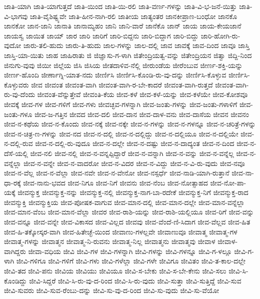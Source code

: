 ಜಾತಿ-ಯಾಗಿ
ಜಾತಿ-ಯಾಗುತ್ತದೆ
ಜಾತಿ-ಯಿಂದ
ಜಾತಿ-ಯಿ-ರಲಿ
ಜಾತಿ-ವರ್ಣ-ಗಳನ್ನು
ಜಾತಿ-ವಿ-ಭ-ಜನೆ-ಯಿತ್ತು
ಜಾತಿ-ವಿ-ಭಾಗವು
ಜಾತಿ-ವೈಶಿಷ್ಟ್ಯವೇ
ಜಾತಿ-ಹೀನ-ನಾಗಿ-ರಲಿ
ಜಾತೀಯ
ಜಾತ್ಯಂತರ
ಜಾನಕೀಪ್ರಾಣ-ಬಂಧೋ
ಜಾನಕೊ
ಜಾನಕೋ
ಜಾನ-ಜಾನಿ
ಜಾನಾತಿ
ಜಾನಾಮ್ಯಹಂ
ಜಾನಿ
ಜಾನಿ-ವಾರೆ
ಜಾನೆಕೊ
ಜಾನ್
ಜಾಯ
ಜಾಯ-ಕೇಯಜಾನೆ
ಜಾಯಸ್ವ
ಜಾಯಿತ
ಜಾಯ್
ಜಾರ
ಜಾರಿ
ಜಾರಿಗೆ
ಜಾರಿ-ಬಿದ್ದನು
ಜಾರಿ-ಬಿದ್ದಾಗ
ಜಾರಿ-ಬಿದ್ದು
ಜಾರಿ-ಹೋಗಿ-ರು-ವುದೋ
ಜಾರು-ತಲಿ-ಹುದು
ಜಾರು-ತಿ-ಹುದು
ಜಾಲ-ಗಳನ್ನು
ಜಾಲ-ದಲ್ಲಿ
ಜಾವ
ಜಾವಕ್ಕೆ
ಜಾವ-ದಿಂದ
ಜಾವೂ
ಜಾಸ್ತಿ
ಜಾಸ್ತಿ-ಯಾ-ಯಿತು
ಜಾಹ
ಜಾಹಿರಾತು
ಜಿ
ಜಿಜ್ಞಾಸು-ಗ-ಳಾಗಿ
ಜಿತೇಂದ್ರಿಯತ್ವ-ವನ್ನು
ಜಿತೇಂದ್ರಿಯನ
ಜಿತ್ವಾ
ಜಿದ್ದಿ-ನಿಂದ
ಜಿನುಗು-ವುವು
ಜಿಯೀ
ಜಿಲ್ಲೆಯ
ಜಿಸಿ
ಜಿಸಿಯ
ಜೀತದಾಳಿವ-ನೆಲ್ಲಿ
ಜೀರುಂಡೆಯ
ಜೀರೆಂಬುವ
ಜೀರ್ಣ-ಶಕ್ತಿ-ಯನ್ನು
ಜೀರ್ಣ-ಹೊಂದಿ
ಜೀರ್ಣಾಗ್ನಿ-ಯಾತ-ನದು
ಜೀರ್ಣಿಸಿ
ಜೀರ್ಣಿಸಿ-ಕೊಂಡಿ-ರು-ವು-ದನ್ನು
ಜೀರ್ಣಿಸಿ-ಕೊಳ್ಳುವ
ಜೀರ್ಣಿಸಿ-ಕೊಳ್ಳುವರು
ಜೀವ
ಜೀವಂತ
ಜೀವಂತ-ವಾಗಿ
ಜೀವಂತ-ವಾಗಿ-ರ-ಬೇ-ಕಾದರೆ
ಜೀವಂತ-ವಾಗಿ-ರುತ್ತದೆ
ಜೀವಂತ-ವಾಗಿ-ರು-ವು-ದೆಂದು
ಜೀವಂತ-ವೆನ್ನುತ್ತೇವೆ
ಜೀವಂತಿ-ಕೆಯ
ಜೀವ-ಕಳೆ
ಜೀವ-ಕಳೆ-ಯನ್ನು
ಜೀವ-ಕಳೆಯೇ
ಜೀವ-ಕೋಶವೂ
ಜೀವಕ್ಕೆ
ಜೀವ-ಗಳ
ಜೀವ-ಗಳಿಗೆ
ಜೀವ-ಗಳು
ಜೀವಚ್ಛವ-ಗಳನ್ನಾಗಿ
ಜೀವ-ಜಂತು-ಗಳನ್ನು
ಜೀವ-ಜಂತು-ಗಳಾಳಿಗೆ
ಜೀವ-ಜಂತು-ಗಳೂ
ಜೀವ-ಜ-ಗತ್ತಿನ
ಜೀವದ
ಜೀವ-ದಲಿ
ಜೀವ-ದಾನ
ಜೀವ-ದಾಳ-ವನು
ಜೀವ-ದಾಸೆಯ
ಜೀವನ
ಜೀವನಂ
ಜೀವ-ನ-ಕಥೆಯ
ಜೀವ-ನ-ಕೊಂದು
ಜೀವ-ನಕ್ಕೆ
ಜೀವ-ನಕ್ಕೇ
ಜೀವ-ನ-ಗಳನ್ನು
ಜೀವ-ನ-ಗಳನ್ನೂ
ಜೀವ-ನ-ಚರಿತ್ರೆ-ಗಳನ್ನು
ಜೀವ-ನ-ಚಿತ್ರ-ಣ-ಗಳನ್ನು
ಜೀವ-ನದ
ಜೀವ-ನ-ದಲ್ಲಿ
ಜೀವ-ನ-ದಲ್ಲಿದ್ದು
ಜೀವ-ನ-ದಲ್ಲಿಯೂ
ಜೀವ-ನ-ದಲ್ಲಿಯೇ
ಜೀವ-ನ-ದಲ್ಲಿ-ರುವ
ಜೀವ-ನ-ದಲ್ಲಿ-ರು-ವುದೂ
ಜೀವ-ನ-ದಲ್ಲೇ
ಜೀವ-ನ-ದಷ್ಟು
ಜೀವ-ನ-ದಾದ್ಯಂತ
ಜೀವ-ನ-ದಿಂದ
ಜೀವ-ನ-ದೆಸೆ-ಯಲ್ಲಿ
ಜೀವ-ನಲಿ
ಜೀವ-ನಲ್ಲಿ
ಜೀವ-ನ-ವನ್ನಪ್ಪಿದ್ದಾರೆ
ಜೀವ-ನ-ವನ್ನಾಗಿ
ಜೀವ-ನ-ವನ್ನು
ಜೀವ-ನ-ವನ್ನೆಲ್ಲ
ಜೀವ-ನ-ವನ್ನೆಲ್ಲಾ
ಜೀವ-ನ-ವನ್ನೇ
ಜೀವ-ನ-ವಾದರೋ
ಜೀವ-ನ-ವಿದರ
ಜೀವ-ನ-ವಿದ್ದು
ಜೀವ-ನ-ವಿ-ರು-ವುದು
ಜೀವ-ನವೂ
ಜೀವ-ನ-ವೆಲ್ಲ
ಜೀವ-ನ-ವೆಲ್ಲಾ
ಜೀವ-ನವೇ
ಜೀವ-ನ-ವೇನೋ
ಜೀವ-ನಸ್ಪರ್ಧೆ
ಜೀವ-ನಾಡಿ-ಯಾಗಿ-ರುತ್ತಾನೆ
ಜೀವ-ನಾ-ಧಾ-ರಕ್ಕೆ
ಜೀವ-ನಾನು-ಭವದ
ಜೀವ-ನಿಗೂ
ಜೀವ-ನಿಗೆ
ಜೀವನು
ಜೀವ-ನೆಂಬ
ಜೀವ-ನೋತ್ಸಾಹದ
ಜೀವ-ನೋ-ಪಾ-ಯಕ್ಕೆ
ಜೀವನ್ಮುಕ್ತ
ಜೀವನ್ಮುಕ್ತ-ನನ್ನು
ಜೀವನ್ಮುಕ್ತ-ನಲ್ಲಿ
ಜೀವನ್ಮುಕ್ತ-ನಾಗ-ಬಾ-ರದೇಕೆ
ಜೀವನ್ಮುಕ್ತ-ನಿಗೆ
ಜೀವನ್ಮುಕ್ತ-ರಾದ
ಜೀವನ್ಮುಕ್ತಿ
ಜೀವನ್ಮುಕ್ತಿಯ
ಜೀವ-ಪೋಷಕ-ವಾಗುವ
ಜೀವ-ಮಾನ-ದಲ್ಲಿ
ಜೀವ-ಮಾನ-ದಲ್ಲೇ
ಜೀವ-ಮಾನ-ವನ್ನೆಲ್ಲಾ
ಜೀವ-ಮಾನ-ವೆಂಬ
ಜೀವ-ಮಾನ-ವೆಲ್ಲಾ
ಜೀವರ
ಜೀವ-ರಾಶಿ-ಯನ್ನು
ಜೀವ-ರಾಶಿ-ಯಲ್ಲಿಯೂ
ಜೀವ-ರಿಗೆ
ಜೀವ-ವನ್ನು
ಜೀವ-ವನ್ನೂ
ಜೀವ-ವನ್ನೇ
ಜೀವ-ವಿಕಾಸದ
ಜೀವ-ವಿಲ್ಲದ
ಜೀವವು
ಜೀವ-ವೆಂದೆ-ಣಿ-ಸಿದಾಗ
ಜೀವ-ವೆಲ್ಲವ
ಜೀವ-ಹಿತ
ಜೀವ-ಹಿ-ತಕ್ಕೋಸ್ಕರ-ವಾಗಿ
ಜೀವ-ಹಿತೇಚ್ಛೆ-ಯಿಂದ
ಜೀವಾಣು-ಗಳಲ್ಲವೇ
ಜೀವಾಣುವೂ
ಜೀವಾತ್ಮ
ಜೀವಾತ್ಮ-ಗಳ
ಜೀವಾತ್ಮ-ಗಳನ್ನು
ಜೀವಾತ್ಮನ
ಜೀವಾತ್ಮ-ನಿ-ರುವನು
ಜೀವಾತ್ಮ-ನಿಲ್ಲ
ಜೀವಾತ್ಮನು
ಜೀವಾತ್ಮವು
ಜೀವಾಳ
ಜೀವಾಳ-ವಾಗಿದ್ದರು
ಜೀವಾ-ವಧಿಯ
ಜೀವಿ
ಜೀವಿ-ಗಳ
ಜೀವಿ-ಗಳನ್ನಾಗಿ
ಜೀವಿ-ಗಳನ್ನು
ಜೀವಿ-ಗಳನ್ನೂ
ಜೀವಿ-ಗ-ಳಲ್ಲೂ
ಜೀವಿ-ಗ-ಳಾಗಿ
ಜೀವಿ-ಗಳಿಗೂ
ಜೀವಿ-ಗಳಿಗೆ
ಜೀವಿ-ಗಳು
ಜೀವಿ-ಗಳೆಲ್ಲಾ
ಜೀವಿ-ಗಳೇ
ಜೀವಿಗೂ
ಜೀವಿತಂ
ಜೀವಿ-ತ-ಕಾಲ-ದಲ್ಲೇ
ಜೀವಿ-ತದ
ಜೀವಿ-ಪನು
ಜೀವಿಯ
ಜೀವಿಯು
ಜೀವಿಯೂ
ಜೀವಿ-ಸ-ಬೇಕು
ಜೀವಿ-ಸ-ಬೇ-ಕೇನು
ಜೀವಿ-ಸಲು
ಜೀವಿ-ಸಿ-ಕೊಂಡಿದ್ದು
ಜೀವಿ-ಸಿದ್ದರೆ
ಜೀವಿ-ಸಿ-ರು-ವು-ದ-ರಿಂದ
ಜೀವಿ-ಸಿ-ರು-ವುದು
ಜೀವಿ-ಸುತ್ತಾ
ಜೀವಿ-ಸುತ್ತಿದ್ದೆ
ಜೀವಿ-ಸುವ
ಜೀವಿ-ಸುವರು
ಜೀವಿ-ಸುವ-ರೆಂಬು-ದನ್ನು
ಜೀವಿ-ಸು-ವು-ದ-ರಿಂದ
ಜೀವಿ-ಸು-ವುದು
ಜೀವಿ-ಸು-ವೆಯೋ
